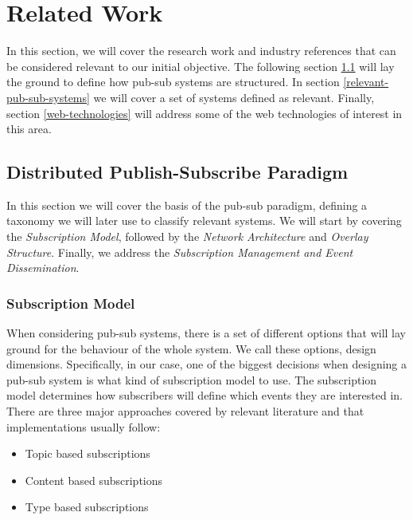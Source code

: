 
\chapter{Related Work}
\label{chapter:related-work}

In this section, we will cover the research work and industry references that
can be considered relevant to our initial objective. The following section
\ref{distributed-publish-subscribe-paradigm} will lay the ground to define how
pub-sub systems are structured. In section \ref{relevant-pub-sub-systems} we
will cover a set of systems defined as relevant. Finally, section
\ref{web-technologies} will address some of the web technologies of interest in
this area.

\section{Distributed Publish-Subscribe
Paradigm}\label{distributed-publish-subscribe-paradigm}

In this section we will cover the basis of the pub-sub paradigm, defining a
taxonomy we will later use to classify relevant systems. We will start by
covering the \emph{Subscription Model}, followed by the \emph{Network
Architecture} and \emph{Overlay Structure}. Finally, we
address the \emph{Subscription Management and Event Dissemination}.

\subsection{Subscription Model}\label{subscription-model}

When considering pub-sub systems, there is a set of different options that will
lay ground for the behaviour of the whole system. We call these options, design
dimensions. Specifically, in our case, one of the biggest decisions when
designing a pub-sub system is what kind of subscription model to use. The
subscription model determines how subscribers will define which events they are
interested in. There are three major approaches covered by relevant literature
\cite{Kermarrec2013} \cite{Eugster2003} and that implementations usually
follow:

\begin{itemize}
  \item
    Topic based subscriptions
  \item
    Content based subscriptions
  \item
    Type based subscriptions
\end{itemize}

